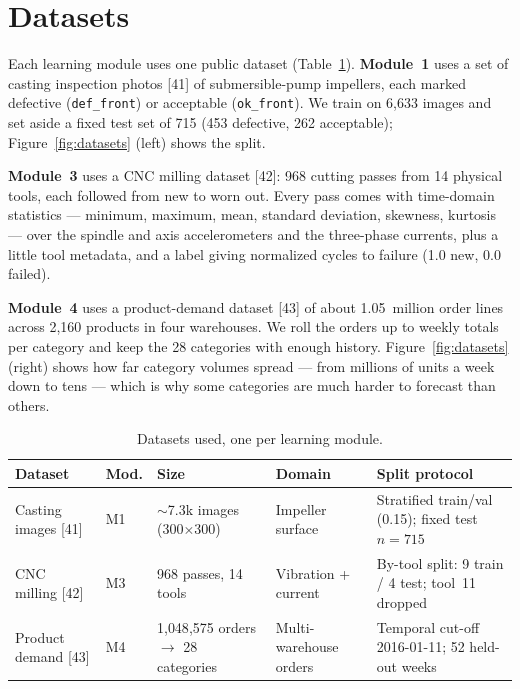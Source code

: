 \documentclass[12pt]{article}
\begin{document}
\section{Datasets}
\label{sec:data}

Each learning module uses one public dataset (Table~\ref{tab:datasets}).
\textbf{Module~1} uses a set of casting inspection photos [41] of submersible-pump
impellers, each marked defective (\texttt{def\_front}) or acceptable
(\texttt{ok\_front}). We train on 6{,}633 images and set aside a fixed test set of
715 (453 defective, 262 acceptable); Figure~\ref{fig:datasets} (left) shows the
split.

\textbf{Module~3} uses a CNC milling dataset [42]: 968 cutting passes from 14
physical tools, each followed from new to worn out. Every pass comes with
time-domain statistics --- minimum, maximum, mean, standard deviation, skewness,
kurtosis --- over the spindle and axis accelerometers and the three-phase currents,
plus a little tool metadata, and a label giving normalized cycles to failure (1.0
new, 0.0 failed).

\textbf{Module~4} uses a product-demand dataset [43] of about 1.05~million order
lines across 2{,}160 products in four warehouses. We roll the orders up to weekly
totals per category and keep the 28 categories with enough history.
Figure~\ref{fig:datasets} (right) shows how far category volumes spread --- from
millions of units a week down to tens --- which is why some categories are much
harder to forecast than others.

\begin{table}[H]
\caption{Datasets used, one per learning module.}
\label{tab:datasets}
\centering
\small
\begin{tabular}{@{}p{2.4cm}p{0.8cm}p{3.2cm}p{2.4cm}p{3.2cm}@{}}
\toprule
Dataset & Mod. & Size & Domain & Split protocol \\
\midrule
Casting images [41] & M1 & $\sim$7.3k images (300$\times$300) & Impeller surface & Stratified train/val (0.15); fixed test $n{=}715$ \\
CNC milling [42] & M3 & 968 passes, 14 tools & Vibration + current & By-tool split: 9 train / 4 test; tool~11 dropped \\
Product demand [43] & M4 & 1{,}048{,}575 orders $\to$ 28 categories & Multi-warehouse orders & Temporal cut-off 2016-01-11; 52 held-out weeks \\
\bottomrule
\end{tabular}
\end{table}
\end{document}
